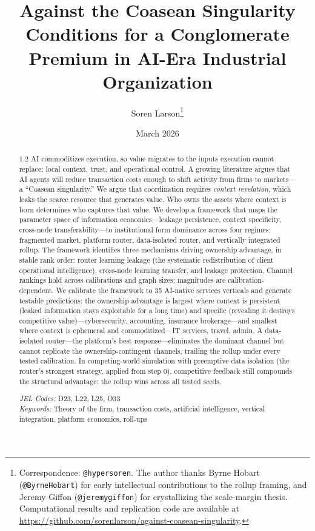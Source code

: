 \documentclass[12pt]{article}
\title{\textbf{Against the Coasean Singularity}\\ \large Conditions for a Conglomerate Premium in AI-Era Industrial Organization}
\author{Soren Larson\thanks{Correspondence: \texttt{@hypersoren}. The author thanks Byrne Hobart (\texttt{@ByrneHobart}) for early intellectual contributions to the rollup framing, and Jeremy Giffon (\texttt{@jeremygiffon}) for crystallizing the scale-margin thesis. Computational results and replication code are available at \url{https://github.com/sorenlarson/against-coasean-singularity}.}}
\date{March 2026}
\theoremstyle{definition}
\begin{document}
\maketitle

\begin{abstract}
\begin{spacing}{1.2}
\noindent AI commoditizes execution, so value migrates to the inputs execution cannot replace: local context, trust, and operational control. A growing literature argues that AI agents will reduce transaction costs enough to shift activity from firms to markets---a ``Coasean singularity.'' We argue that coordination requires \textit{context revelation}, which leaks the scarce resource that generates value. Who owns the assets where context is born determines who captures that value. We develop a framework that maps the parameter space of information economics---leakage persistence, context specificity, cross-node transferability---to institutional form dominance across four regimes: fragmented market, platform router, data-isolated router, and vertically integrated rollup. The framework identifies three mechanisms driving ownership advantage, in stable rank order: router learning leakage (the systematic redistribution of client operational intelligence), cross-node learning transfer, and leakage protection. Channel rankings hold across calibrations and graph sizes; magnitudes are calibration-dependent. We calibrate the framework to 35 AI-native services verticals and generate testable predictions: the ownership advantage is largest where context is persistent (leaked information stays exploitable for a long time) and specific (revealing it destroys competitive value)---cybersecurity, accounting, insurance brokerage---and smallest where context is ephemeral and commoditized---IT services, travel, admin. A data-isolated router---the platform's best response---eliminates the dominant channel but cannot replicate the ownership-contingent channels, trailing the rollup under every tested calibration. In competing-world simulation with preemptive data isolation (the router's strongest strategy, applied from step 0), competitive feedback still compounds the structural advantage: the rollup wins across all tested seeds.

\bigskip
\noindent \textit{JEL Codes:} D23, L22, L25, O33 \\
\textit{Keywords:} Theory of the firm, transaction costs, artificial intelligence, vertical integration, platform economics, roll-ups
\end{spacing}
\end{abstract}
\end{document}
